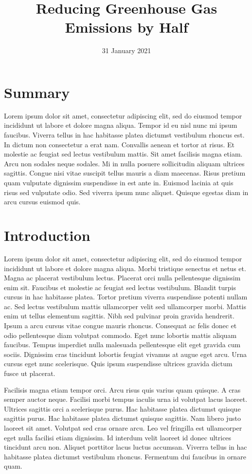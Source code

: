\documentclass[12pt, oneside, a4paper]{article}
\title{Reducing Greenhouse Gas Emissions by Half}
\date{31 January 2021}
\begin{document}
\maketitle 

\section*{Summary}
\renewcommand\baselinestretch{1}\selectfont
\noindent Lorem ipsum dolor sit amet, consectetur adipiscing elit, sed do eiusmod tempor incididunt ut labore et dolore magna aliqua. Tempor id eu nisl nunc mi ipsum faucibus. Viverra tellus in hac habitasse platea dictumst vestibulum rhoncus est. In dictum non consectetur a erat nam. Convallis aenean et tortor at risus. Et molestie ac feugiat sed lectus vestibulum mattis. Sit amet facilisis magna etiam. Arcu non sodales neque sodales. Mi in nulla posuere sollicitudin aliquam ultrices sagittis. Congue nisi vitae suscipit tellus mauris a diam maecenas. Risus pretium quam vulputate dignissim suspendisse in est ante in. Euismod lacinia at quis risus sed vulputate odio. Sed viverra ipsum nunc aliquet. Quisque egestas diam in arcu cursus euismod quis. 

\clearpage
\section*{Introduction}
Lorem ipsum dolor sit amet, consectetur adipiscing elit, sed do eiusmod tempor incididunt ut labore et dolore magna aliqua. Morbi tristique senectus et netus et. Magna ac placerat vestibulum lectus. Placerat orci nulla pellentesque dignissim enim sit. Faucibus et molestie ac feugiat sed lectus vestibulum. Blandit turpis cursus in hac habitasse platea. Tortor pretium viverra suspendisse potenti nullam ac. Sed lectus vestibulum mattis ullamcorper velit sed ullamcorper morbi. Mattis enim ut tellus elementum sagittis. Nibh sed pulvinar proin gravida hendrerit. Ipsum a arcu cursus vitae congue mauris rhoncus. Consequat ac felis donec et odio pellentesque diam volutpat commodo. Eget nunc lobortis mattis aliquam faucibus. Tempus imperdiet nulla malesuada pellentesque elit eget gravida cum sociis. Dignissim cras tincidunt lobortis feugiat vivamus at augue eget arcu. Urna cursus eget nunc scelerisque. Quis ipsum suspendisse ultrices gravida dictum fusce ut placerat.

Facilisis magna etiam tempor orci. Arcu risus quis varius quam quisque. A cras semper auctor neque. Facilisi morbi tempus iaculis urna id volutpat lacus laoreet. Ultrices sagittis orci a scelerisque purus. Hac habitasse platea dictumst quisque sagittis purus. Hac habitasse platea dictumst quisque sagittis. Nam libero justo laoreet sit amet. Volutpat sed cras ornare arcu. Leo vel fringilla est ullamcorper eget nulla facilisi etiam dignissim. Id interdum velit laoreet id donec ultrices tincidunt arcu non. Aliquet porttitor lacus luctus accumsan. Viverra tellus in hac habitasse platea dictumst vestibulum rhoncus. Fermentum dui faucibus in ornare quam.
\end{document}

